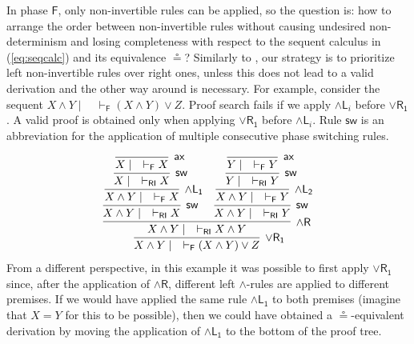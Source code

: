 \documentclass[submission,copyright,creativecommons]{eptcs}
\theoremstyle{definition}
\newcommand{\andlone}{\land \mathsf{L_{1}}}
\newcommand{\andltwo}{\land \mathsf{L_{2}}}
\newcommand{\andli}{\land \mathsf{L}_{i}}
\newcommand{\andr}{\land \mathsf{R}}
\newcommand{\orrone}{\lor \mathsf{R_{1}}}
\newcommand{\ax}{\mathsf{ax}}
\newcommand{\RI}{\mathsf{RI}}
\newcommand{\F}{\mathsf{F}}
\newcommand{\sw}{\mathsf{sw}}
\begin{document}
In phase $\F$, only non-invertible rules can be applied, so the question is: how to arrange the order between non-invertible rules without causing undesired non-determinism and losing completeness with respect to the sequent calculus in (\ref{eq:seqcalc}) and its equivalence $\circeq$? Similarly to \cite{UVW:protsn}, our strategy is to prioritize left non-invertible rules over right ones, unless this does not lead to a valid derivation and the other way around is necessary.
For example, consider the sequent $X \land Y \mid \quad \vdash_{\F} (X \land Y) \lor Z$. Proof search fails if we apply $\andli$ before $\orrone$. A valid proof is obtained only when applying $\orrone$ before $\andli$. Rule $\sw$ is an abbreviation for the application of multiple consecutive phase switching rules.


\begin{equation}\label{eq:ex:focused}
  \begin{array}{c}
     \infer[\orrone]{X \land Y \mid \quad \vdash_\F (X \land Y) \lor Z}{
      \infer[\andr]{X \land Y \mid \quad \vdash_\RI X \land Y}{
        \infer[\sw]{X \land Y \mid \quad \vdash_\RI X}{
          \infer[\andlone]{X \land Y \mid \quad \vdash_\F X}{
          \infer[\sw]{X \mid \quad \vdash_\RI X}{
          \infer[\ax]{X \mid \quad \vdash_\F X}{}
        }}}
        &
        \infer[\sw]{X \land Y \mid \quad \vdash_\RI Y}{
        \infer[\andltwo]{X \land Y \mid \quad \vdash_\F Y}{
          \infer[\sw]{Y \mid \quad \vdash_\RI Y}{
          \infer[\ax]{Y \mid \quad \vdash_\F Y}{}
        }}}
      }
    }
  \end{array}
\end{equation}
From a different perspective, in this example it was possible to first apply $\orrone$ since, after the application of $\andr$, different left $\land$-rules are applied to different premises. If we would have applied  the same rule $\andlone$ to both premises (imagine that $X = Y$ for this to be possible), then we could have obtained a $\circeq$-equivalent derivation by moving the application of $\andlone$ to the bottom of the proof tree. 
\end{document}
